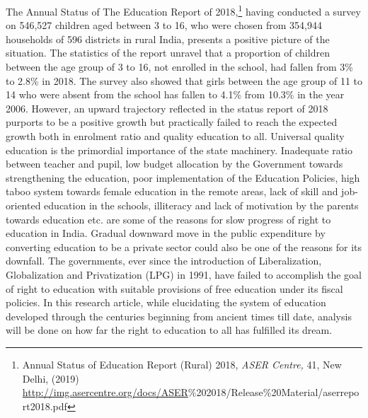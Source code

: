 \setcounter{figure}{0}
\setcounter{table}{0}
\setcounter{footnote}{0}


\begin{multicols}{2}


\vspace{-.1cm}

\noi
The Annual Status of The Education Report of 2018,\footnote{Annual Status of Education Report (Rural) 2018, \textit{ASER Centre,} 41, New Delhi, (2019)\\ \url{http://img.asercentre.org/docs/ASER}\%202018/Release\%20Material/aserreport2018.pdf} having conducted a survey on 546,527 children aged between 3 to 16, who were chosen from 354,944 households of 596 districts in
rural India, presents a positive picture of the situation. The statistics of the report unravel that
a proportion of children between the age group of 3 to 16, not enrolled in the school, had
fallen from 3\% to 2.8\% in 2018. The survey also showed that girls between the age group of
11 to 14 who were absent from the school has fallen to 4.1\% from 10.3\% in the year 2006.
However, an upward trajectory reflected in the status report of 2018 purports to be a positive
growth but practically failed to reach the expected growth both in enrolment ratio and quality
education to all. Universal quality education is the primordial importance of the state
machinery. Inadequate ratio between teacher and pupil, low budget allocation by the
Government towards strengthening the education, poor implementation of the Education
Policies, high taboo system towards female education in the remote areas, lack of skill and
job-oriented education in the schools, illiteracy and lack of motivation by the parents towards
education etc. are some of the reasons for slow progress of right to education in India.
Gradual downward move in the public expenditure by converting education to be a private
sector could also be one of the reasons for its downfall. The governments, ever since the
introduction of Liberalization, Globalization and Privatization (LPG) in 1991, have failed to
accomplish the goal of right to education with suitable provisions of free education under its
fiscal policies. In this research article, while elucidating the system of education developed
through the centuries beginning from ancient times till date, analysis will be done on how far
the right to education to all has fulfilled its dream.


\end{multicols}
